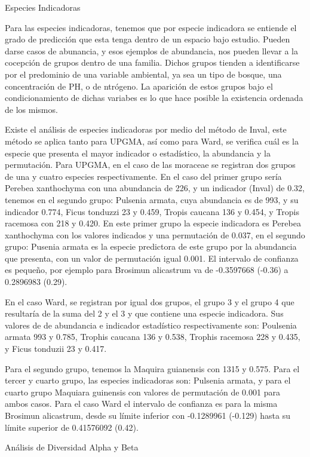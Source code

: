 \documentclass[11pt,]{article}
\begin{document}
Especies Indicadoras

Para las especies indicadoras, tenemos que por especie indicadora se
entiende el grado de predicción que esta tenga dentro de un espacio bajo
estudio. Pueden darse casos de abunancia, y esos ejemplos de abundancia,
nos pueden llevar a la cocepción de grupos dentro de una familia. Dichos
grupos tienden a identificarse por el predominio de una variable
ambiental, ya sea un tipo de bosque, una concentración de PH, o de
ntrógeno. La aparición de estos grupos bajo el condicionamiento de
dichas variabes es lo que hace posible la existencia ordenada de los
mismos.

Existe el análisis de especies indicadoras por medio del método de
Inval, este método se aplica tanto para UPGMA, así como para Ward, se
verifica cuál es la especie que presenta el mayor indicador o
estadístico, la abundancia y la permutación. Para UPGMA, en el caso de
las moraceae se registran dos grupos de una y cuatro especies
respectivamente. En el caso del primer grupo sería Perebea xanthochyma
con una abundancia de 226, y un indicador (Inval) de 0.32, tenemos en el
segundo grupo: Pulsenia armata, cuya abundancia es de 993, y su
indicador 0.774, Ficus tonduzzi 23 y 0.459, Tropis caucana 136 y 0.454,
y Tropis racemosa con 218 y 0.420. En este primer grupo la especie
indicadora es Perebea xanthochyma con los valores indicados y una
permutación de 0.037, en el segundo grupo: Pusenia armata es la especie
predictora de este grupo por la abundancia que presenta, con un valor de
permutación igual 0.001. El intervalo de confianza es pequeño, por
ejemplo para Brosimun alicastrum va de -0.3597668 (-0.36) a 0.2896983
(0.29).

En el caso Ward, se registran por igual dos grupos, el grupo 3 y el
grupo 4 que resultaría de la suma del 2 y el 3 y que contiene una
especie indicadora. Sus valores de de abundancia e indicador estadístico
respectivamente son: Poulsenia armata 993 y 0.785, Trophis caucana 136 y
0.538, Trophis racemosa 228 y 0.435, y Ficus tonduzii 23 y 0.417.

Para el segundo grupo, tenemos la Maquira guianensis con 1315 y 0.575.
Para el tercer y cuarto grupo, las especies indicadoras son: Pulsenia
armata, y para el cuarto grupo Maquiara guinensis con valores de
permutación de 0.001 para ambos casos. Para el caso Ward el intervalo de
confianza es para la misma Brosimun alicastrum, desde su límite inferior
con -0.1289961 (-0.129) hasta su límite superior de 0.41576092 (0.42).

Análisis de Diversidad Alpha y Beta
\end{document}
